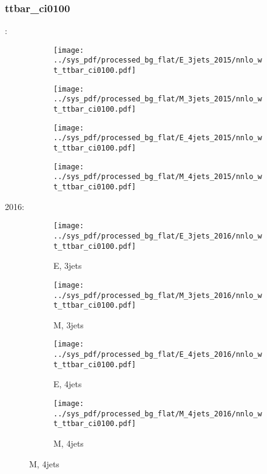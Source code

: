 \documentclass{beamer}
\begin{document}
\begin{frame}
\frametitle{ttbar_ci0100}
\fontsize{5}{1}:
\begin{figure}
\centering
\begin{subfigure}[b]{0.24\textwidth}
\texttt{[image: ../sys\_pdf/processed\_bg\_flat/E\_3jets\_2015/nnlo\_wt\_ttbar\_ci0100.pdf]}
\end{subfigure}
\begin{subfigure}[b]{0.24\textwidth}
\texttt{[image: ../sys\_pdf/processed\_bg\_flat/M\_3jets\_2015/nnlo\_wt\_ttbar\_ci0100.pdf]}
\end{subfigure}
\begin{subfigure}[b]{0.24\textwidth}
\texttt{[image: ../sys\_pdf/processed\_bg\_flat/E\_4jets\_2015/nnlo\_wt\_ttbar\_ci0100.pdf]}
\end{subfigure}
\begin{subfigure}[b]{0.24\textwidth}
\texttt{[image: ../sys\_pdf/processed\_bg\_flat/M\_4jets\_2015/nnlo\_wt\_ttbar\_ci0100.pdf]}
\end{subfigure}
\end{figure}
2016:
\begin{figure}
\centering
\begin{subfigure}[b]{0.24\textwidth}
\texttt{[image: ../sys\_pdf/processed\_bg\_flat/E\_3jets\_2016/nnlo\_wt\_ttbar\_ci0100.pdf]}
\captionsetup{font=tiny}
\caption{E, 3jets}
\end{subfigure}
\begin{subfigure}[b]{0.24\textwidth}
\texttt{[image: ../sys\_pdf/processed\_bg\_flat/M\_3jets\_2016/nnlo\_wt\_ttbar\_ci0100.pdf]}
\captionsetup{font=tiny}
\caption{M, 3jets}
\end{subfigure}
\begin{subfigure}[b]{0.24\textwidth}
\texttt{[image: ../sys\_pdf/processed\_bg\_flat/E\_4jets\_2016/nnlo\_wt\_ttbar\_ci0100.pdf]}
\captionsetup{font=tiny}
\caption{E, 4jets}
\end{subfigure}
\begin{subfigure}[b]{0.24\textwidth}
\texttt{[image: ../sys\_pdf/processed\_bg\_flat/M\_4jets\_2016/nnlo\_wt\_ttbar\_ci0100.pdf]}
\captionsetup{font=tiny}
\caption{M, 4jets}
\end{subfigure}
\end{figure}
\end{frame}
\end{document}
